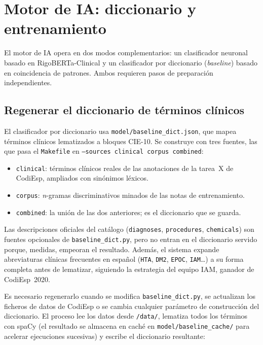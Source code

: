 \section{Motor de IA: diccionario y entrenamiento}

El motor de IA opera en dos modos complementarios: un clasificador neuronal basado en RigoBERTa-Clinical y un clasificador por diccionario (\emph{baseline}) basado en coincidencia de patrones. Ambos requieren pasos de preparación independientes.

\subsection{Regenerar el diccionario de términos clínicos}

El clasificador por diccionario usa \texttt{model/baseline\_dict.json}, que mapea términos clínicos lematizados a bloques CIE-10. Se construye con tres fuentes, las que pasa el \texttt{Makefile} en \texttt{--sources clinical corpus combined}:

\begin{itemize}
 \item \texttt{clinical}: términos clínicos reales de las anotaciones de la tarea~X de CodiEsp, ampliados con sinónimos léxicos.
 \item \texttt{corpus}: \emph{n}-gramas discriminativos minados de las notas de entrenamiento.
 \item \texttt{combined}: la unión de las dos anteriores; es el diccionario que se guarda.
\end{itemize}

Las descripciones oficiales del catálogo (\texttt{diagnoses}, \texttt{procedures}, \texttt{chemicals}) son fuentes opcionales de \texttt{baseline\_dict.py}, pero no entran en el diccionario servido porque, medidas, empeoran el resultado. Además, el sistema expande abreviaturas clínicas frecuentes en español (\texttt{HTA}, \texttt{DM2}, \texttt{EPOC}, \texttt{IAM}\dots) a su forma completa antes de lematizar, siguiendo la estrategia del equipo IAM, ganador de CodiEsp~2020.

Es necesario regenerarlo cuando se modifica \texttt{baseline\_dict.py}, se actualizan los ficheros de datos de CodiEsp o se cambia cualquier parámetro de construcción del diccionario. El proceso lee los datos desde \texttt{/data/}, lematiza todos los términos con spaCy (el resultado se almacena en caché en \texttt{model/baseline\_cache/} para acelerar ejecuciones sucesivas) y escribe el diccionario resultante:


